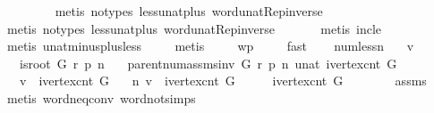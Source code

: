 \begin{isabellebody}
\ \ \ \ \ \ \ \isamarkupfalse%
\ {\isacharparenleft}metis\ {\isacharparenleft}no{\isacharunderscore}types{\isacharparenright}\ less{\isacharunderscore}unat{\isacharunderscore}plus{}\ word{\isacharunderscore}unat{\isachardot}Rep{\isacharunderscore}inverse{\isacharparenright}\isanewline
\ \ \ \ \ \ \isamarkupfalse%
\ {\isacharparenleft}metis\ {\isacharparenleft}no{\isacharunderscore}types{\isacharparenright}\ less{\isacharunderscore}unat{\isacharunderscore}plus{}\ word{\isacharunderscore}unat{\isachardot}Rep{\isacharunderscore}inverse{\isacharparenright}\isanewline
\ \ \ \ \ \isamarkupfalse%
\ {\isacharparenleft}metis\ inc{\isacharunderscore}le{\isacharparenright}\isanewline
\ \ \ \ \isamarkupfalse%
\ {\isacharparenleft}metis\ unat{\isacharunderscore}minus{\isacharunderscore}plus{}{\isacharunderscore}less{\isacharparenright}\isanewline
\ \ \ \isamarkupfalse%
\ metis\ \isanewline
\ \ \isamarkupfalse%
\ wp\ \isanewline
\ \ \isamarkupfalse%
\ fast\isanewline
\ \ \isamarkupfalse%
%
\endisatagproof
{\isafoldproof}%
%
\isadelimproof
\isanewline
%
\endisadelimproof
{}\isamarkupfalse%
\ num{\isacharunderscore}less{\isacharunderscore}n{\isacharcolon}\isanewline
\ \ \ v\isanewline
\ \ \ {\isachardoublequoteopen}is{\isacharunderscore}root\ G\ r\ p\ n{\isachardoublequoteclose}\isanewline
\ \ \ {\isachardoublequoteopen}parent{\isacharunderscore}num{\isacharunderscore}assms{\isacharunderscore}inv\ G\ r\ p\ n\ {\isacharparenleft}unat\ {\isacharparenleft}ivertex{\isacharunderscore}cnt\ G{\isacharparenright}{\isacharparenright}{\isachardoublequoteclose}\isanewline
\ \ \ {\isachardoublequoteopen}v\ {\isacharless}\ ivertex{\isacharunderscore}cnt\ G{\isachardoublequoteclose}\isanewline
\ \ \ {\isachardoublequoteopen}n\ v\ {\isacharless}\ ivertex{\isacharunderscore}cnt\ G{\isachardoublequoteclose}\isanewline
%
\isadelimproof
%
\endisadelimproof
%
\isatagproof
{}\isamarkupfalse%
\ {\isacharminus}\isanewline
\ \ \isamarkupfalse%
\ {\isachardoublequoteopen}ivertex{\isacharunderscore}cnt\ G\ {\isachargreater}\ {}{\isachardoublequoteclose}\isanewline
\ \ \ \ \isamarkupfalse%
\ assms\ \isamarkupfalse%
\ {\isacharparenleft}metis\ word{\isacharunderscore}neq{\isacharunderscore}{}{\isacharunderscore}conv\ word{\isacharunderscore}not{\isacharunderscore}simps{\isacharparenleft}{}{\isacharparenright}{\isacharparenright}\isanewline

\end{isabellebody}
